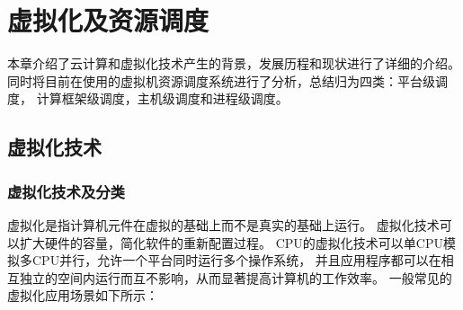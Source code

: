
\chapter{虚拟化及资源调度}
\label{chap:outline}
本章介绍了云计算和虚拟化技术产生的背景，发展历程和现状进行了详细的介绍。
同时将目前在使用的虚拟机资源调度系统进行了分析，总结归为四类：平台级调度，
计算框架级调度，主机级调度和进程级调度。

\section{虚拟化技术}

\subsection{虚拟化技术及分类}
虚拟化\cite{ref16}是指计算机元件在虚拟的基础上而不是真实的基础上运行。
虚拟化技术可以扩大硬件的容量，简化软件的重新配置过程。
CPU的虚拟化技术可以单CPU模拟多CPU并行，允许一个平台同时运行多个操作系统，
并且应用程序都可以在相互独立的空间内运行而互不影响，从而显著提高计算机的工作效率。
一般常见的虚拟化应用场景如下所示：

